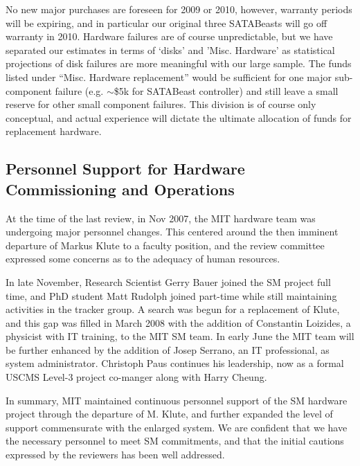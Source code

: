 No new major purchases are foreseen for 2009 or 2010, 
however, warranty periods will be expiring, and in particular our original
three SATABeasts will go off warranty in 2010.
Hardware failures are of course unpredictable, but we have separated
our estimates in terms of `disks' and 'Misc. Hardware' as  statistical
projections of disk failures are more meaningful with our large sample.
The funds listed under ``Misc. Hardware replacement'' would be sufficient
for one major sub-component failure (e.g. $\sim$\$5k for SATABeast controller) and
still leave a small reserve for other small component failures.
This division is of course only conceptual, and
actual experience will dictate the ultimate allocation of funds for replacement 
hardware.

\subsection{Personnel Support for Hardware Commissioning and Operations}

At the time of the last review, in Nov 2007, the MIT hardware team 
was undergoing major personnel changes.
This centered around the then imminent departure of Markus Klute
to a faculty position, and the review committee expressed
some concerns as to the adequacy of human resources.


In late November, Research Scientist Gerry Bauer joined the SM project
full time, and PhD student Matt Rudolph joined part-time while still maintaining
activities in the tracker group.
A search was begun for a replacement of Klute, and this gap was
filled in March 2008 with the addition of Constantin Loizides,
a physicist with IT training, to the  MIT SM team. 
In early June the MIT team will be further enhanced by the addition
of Josep Serrano, an IT professional, as system administrator.
Christoph Paus continues his leadership, now as a formal USCMS 
Level-3 project co-manger along with Harry Cheung.

In summary, MIT maintained continuous personnel support of the SM hardware project 
through the departure of M. Klute, and further expanded the level of support
commensurate with the enlarged system.
We are confident that we have the necessary personnel to meet SM commitments,
and that the initial cautions expressed by the reviewers 
has been well addressed.



